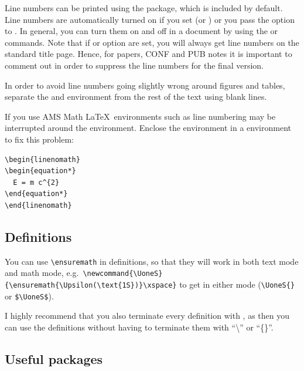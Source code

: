 Line numbers can be printed using the  package, 
which is included by default.
Line numbers are automatically turned on if you set  (or )
or you pass the option  to .
In general, you can turn them on and off in a document by using the  or  commands.
Note that if  or option  are set,
you will always get line numbers on the standard title page.
Hence, for papers, CONF and PUB notes it is important to comment out  in order to suppress the line numbers for the final version.

In order to avoid line numbers going slightly wrong around figures and tables,
separate the  and  environment from the rest of the text using blank lines.

If you use AMS Math \LaTeX\ environments such as  line numbering may be interrupted around the environment.
Enclose the environment in a  environment to fix this problem:
\begin{verbatim}
\begin{linenomath}
\begin{equation*}
  E = m c^{2}
\end{equation*}
\end{linenomath}
\end{verbatim}


\subsection{Definitions}

You can use \verb|\ensuremath| in definitions, so that they will work
in both text mode and math mode, e.g.\
\verb|\newcommand{\UoneS}{\ensuremath{\Upsilon(\text{1S})}\xspace}| to get
\UoneS in either mode (\verb|\UoneS{}| or \verb|$\UoneS$|).

I highly recommend that you also terminate every definition with ,
as then you can use the definitions without having to terminate them with
\enquote{\textbackslash\textvisiblespace} or \enquote{\{\}}.


\subsection{Useful packages}

